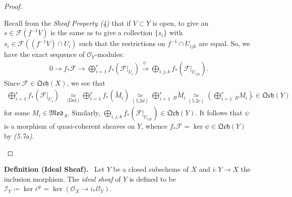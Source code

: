 \documentclass[11pt,a4paper,footinclude=true,headinclude=true]{scrbook} %
\newcommand{\FF}{\mathscr{F}}
\newcommand{\II}{\mathscr{I}}
\newcommand{\OO}{\mathcal{O}}
\newcommand{\<}{\langle}
\newcommand{\>}{\rangle}
\newcommand{\MOD}{\mathfrak{Mod}}
\newcommand{\qcoh}{\mathfrak{Qch}}
\newenvironment{definition}[2][Definition]
    { \begin{mdframed}[backgroundcolor=gray!20] \textbf{#1 #2.}\ }
    {  \end{mdframed}}
\begin{document}
\begin{proof}
\begin{itemize}
        Recall from the \textit{Sheaf Property (4)} that if $V\subset Y$ is open, to give an $s\in\FF(f^{-1}V)$ is the same as to give a collection $\{s_i\}$ with $s_i\in\FF((f^{-1}V)\cap U_i)$ such that the restrictions on $f^{-1}\cap U_{ijk}$ are equal. So, we have the exact sequence of $\OO_Y$-modules:
        \begin{align*}
            0\longrightarrow f_\ast\FF\longrightarrow\bigoplus_{i=1}^rf_\ast(\FF|_{U_i})\xrightarrow{~\psi~~}\bigoplus_{i,j,k}f_\ast(\FF|_{U_{ijk}}).
        \end{align*}
        Since $\FF\in\qcoh(X)$, we see that 
        \begin{align*}
            \bigoplus_{i=1}^rf_\ast(\FF|_{U_i}) &\underset{\text{(Def.)}}{\simeq}\bigoplus_{i=1}^rf_\ast(\widetilde{M}_i) \underset{(5.2d)}{\simeq}\bigoplus_{i=1}^r\,_B\widetilde{M}_i \underset{(5.2c)}{\simeq}(\bigoplus_{i=1}^r\,_BM_i)\widetilde{}\in\qcoh(Y)
        \end{align*}
        for some $M_i\in \MOD_A$. Similarly, $\bigoplus_{i,j,k}f_\ast(\FF|_{U_{ijk}})\in\qcoh(Y)$. It follows that $\psi$ is a morphism of quasi-coherent sheaves on $Y$, whence $f_\ast\FF=\ker\psi\in\qcoh(Y)$ by \textit{(5.7a)}. 
    \end{itemize}
\end{proof}

\begin{definition}{(Ideal Sheaf)}
    Let $Y$ be a closed subscheme of $X$ and $i:Y\to X$ the inclusion morphism. The \textit{ideal sheaf} of $Y$ is defined to be $\II_Y\coloneqq\ker i^\#=\ker(\OO_X\to i_\ast\OO_Y)$.
\end{definition}
\end{document}
